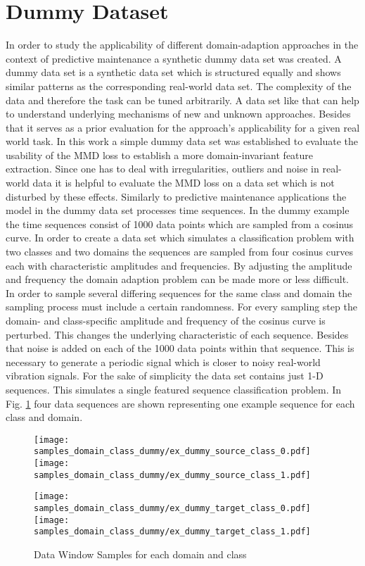 \section{Dummy Dataset}
In order to study the applicability of different domain-adaption approaches in the context of predictive maintenance a synthetic dummy data set
was created. A dummy data set is a synthetic data set which is structured equally and shows similar patterns as the corresponding real-world data set. The complexity of the data and therefore the task can be tuned arbitrarily. A data set like that can help to understand underlying mechanisms of new and unknown approaches. Besides that it serves as a prior evaluation for the approach's applicability for a given real world task. In this work a simple dummy data set was established to evaluate the usability of the MMD loss to establish a more domain-invariant feature extraction. Since one has to deal with irregularities, outliers and noise in real-world data it is helpful to evaluate the MMD loss on a data set which is not disturbed by these effects. Similarly to predictive maintenance applications the model in the dummy data set processes time sequences. In the dummy example the time sequences consist of 1000 data points which are sampled from a cosinus curve. In order to create a data set which simulates a classification problem with two classes and two domains the sequences are sampled from four cosinus curves each with characteristic amplitudes and frequencies. By adjusting the amplitude and frequency the domain adaption problem can be made more or less difficult. In order to sample several differing sequences for the same class and domain the sampling process must include a certain randomness. For every sampling step the domain- and class-specific amplitude and frequency of the cosinus curve is perturbed. This changes the underlying characteristic of each sequence. Besides that noise is added on each of the 1000 data points within that sequence. This is necessary to generate a periodic signal which is closer to noisy real-world vibration signals. For the sake of simplicity the data set contains just 1-D sequences. This simulates a single featured sequence classification problem. In Fig. \ref{fig:samples_domain_class_dummy} four data sequences are shown representing one example sequence for each class and domain. 

\begin{figure}[H]
  \centering
  \texttt{[image: samples\_domain\_class\_dummy/ex\_dummy\_source\_class\_0.pdf]}
  \hspace{.3cm}
  \texttt{[image: samples\_domain\_class\_dummy/ex\_dummy\_source\_class\_1.pdf]}

  \vspace{.1cm}

  \texttt{[image: samples\_domain\_class\_dummy/ex\_dummy\_target\_class\_0.pdf]}
  \hspace{.3cm}
  \texttt{[image: samples\_domain\_class\_dummy/ex\_dummy\_target\_class\_1.pdf]}

  \caption{Data Window Samples for each domain and class}
  \label{fig:samples_domain_class_dummy}
\end{figure}


